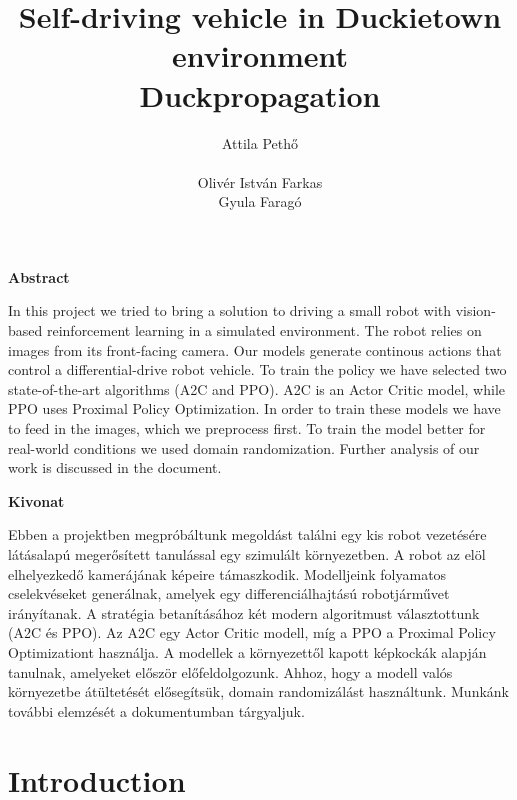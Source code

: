 \documentclass{article}
\title{Self-driving vehicle in Duckietown environment\\
	\large Duckpropagation }
\author{
  Attila Pethő\\\\
   \And  
   Olivér István Farkas\\
   \And
    Gyula Faragó\\
}
\begin{document}

\maketitle



\begin{center}
	\large
	\textbf{Abstract}\\
\end{center}
In this project we tried to bring a solution to driving a small robot with vision-based reinforcement learning in a simulated environment. The robot relies on images from its front-facing camera. Our models generate continous actions that control a differential-drive robot vehicle. To train the policy we have selected two state-of-the-art algorithms (A2C and PPO). A2C is an Actor Critic model, while PPO uses Proximal Policy Optimization. 
In order to train these models we have to feed in the images, which we preprocess first. To train the model better for real-world conditions we used domain randomization. Further analysis of our work is discussed in the document.

\begin{center}
	\large
	\textbf{Kivonat}\\
\end{center}

Ebben a projektben megpróbáltunk megoldást találni egy kis robot vezetésére látásalapú megerősített tanulással egy szimulált környezetben. A robot az elöl elhelyezkedő kamerájának képeire támaszkodik. Modelljeink folyamatos cselekvéseket generálnak, amelyek egy differenciálhajtású robotjárművet irányítanak. A stratégia betanításához két modern algoritmust választottunk (A2C és PPO). 
Az A2C egy Actor Critic modell, míg a PPO a Proximal Policy Optimizationt használja. A modellek a környezettől kapott képkockák alapján tanulnak, amelyeket először előfeldolgozunk. Ahhoz, hogy a modell valós környezetbe átültetését elősegítsük, domain randomizálást használtunk. Munkánk további elemzését a dokumentumban tárgyaljuk.

\section{\large{Introduction}}
\end{document}
